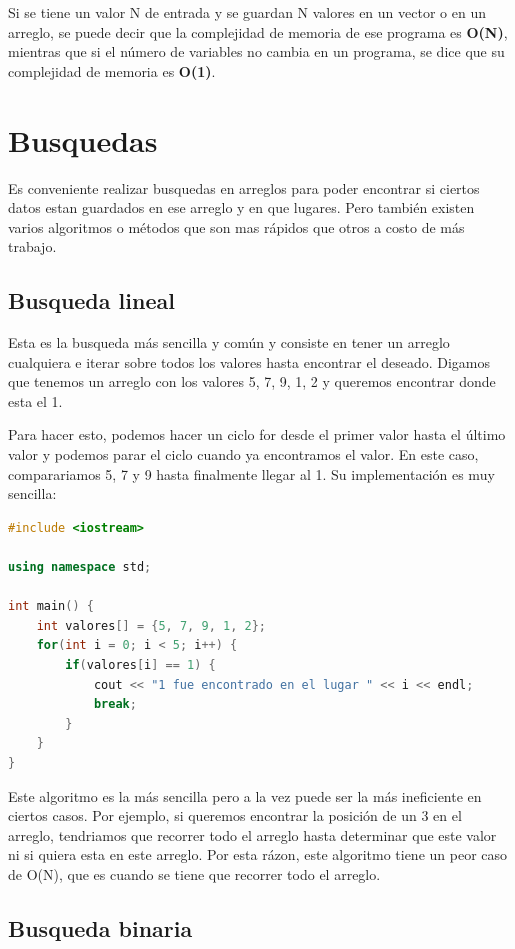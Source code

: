 \documentclass{article}
\begin{document}
Si se tiene un valor N de entrada y se guardan N valores en un vector o en un arreglo, se puede decir que la complejidad de memoria de ese programa es \textbf{O(N)}, mientras que si el número de variables no cambia en un programa, se dice que su complejidad de memoria es \textbf{O(1)}.

\section{Busquedas}

Es conveniente realizar busquedas en arreglos para poder encontrar si ciertos datos estan guardados en ese arreglo y en que lugares. Pero también existen varios algoritmos o métodos que son mas rápidos que otros a costo de más trabajo.

\subsection{Busqueda lineal}

Esta es la busqueda más sencilla y común y consiste en tener un arreglo cualquiera e iterar sobre todos los valores hasta encontrar el deseado. Digamos que tenemos un arreglo con los valores 5, 7, 9, 1, 2 y queremos encontrar donde esta el 1.

Para hacer esto, podemos hacer un ciclo for desde el primer valor hasta el último valor y podemos parar el ciclo cuando ya encontramos el valor. En este caso, comparariamos 5, 7 y 9 hasta finalmente llegar al 1. Su implementación es muy sencilla:

\begin{lstlisting}[language=C++, title=Busqueda lineal]
#include <iostream>

using namespace std;

int main() {
	int valores[] = {5, 7, 9, 1, 2};
	for(int i = 0; i < 5; i++) {
		if(valores[i] == 1) {
			cout << "1 fue encontrado en el lugar " << i << endl;
			break;
		}
	}
}
\end{lstlisting}

Este algoritmo es la más sencilla pero a la vez puede ser la más ineficiente en ciertos casos. Por ejemplo, si queremos encontrar la posición de un 3 en el arreglo, tendriamos que recorrer todo el arreglo hasta determinar que este valor ni si quiera esta en este arreglo. Por esta rázon, este algoritmo tiene un peor caso de O(N), que es cuando se tiene que recorrer todo el arreglo.

\subsection{Busqueda binaria}
\end{document}
